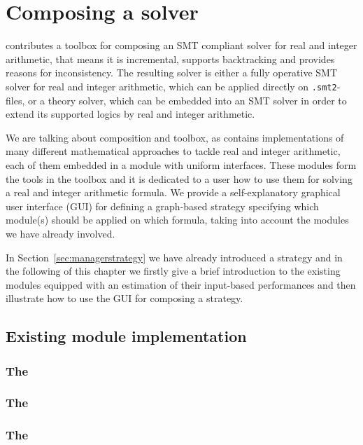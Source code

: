 \chapter{Composing a solver}
\label{chapter:composingats}
\smtrat contributes a toolbox for composing an SMT compliant solver for real and integer arithmetic, that means it 
is incremental, supports backtracking and provides reasons for inconsistency. The resulting
solver is either a fully operative SMT solver for real and integer arithmetic, which can be applied
directly on \texttt{.smt2}-files, or a theory solver, which can be embedded into an SMT 
solver in order to extend its supported logics by real and integer arithmetic.

We are talking about composition and toolbox, as \smtrat contains implementations
of many different mathematical approaches to tackle real and integer arithmetic, each of them
embedded in a module with uniform interfaces. These modules form the tools in the toolbox
and it is dedicated to a user how to use them for solving a real and integer arithmetic formula.
We provide a self-explanatory graphical user interface (GUI) for defining a graph-based 
strategy specifying which module(s) should be applied on which formula, 
taking into account the modules we have already involved.

In Section~\ref{sec:managerstrategy} we have already introduced
a strategy and in the following of this chapter we firstly give a brief introduction 
to the existing modules equipped with an estimation of their input-based performances and then illustrate
how to use the GUI for composing a strategy.

\section{Existing module implementation}
\subsection{The \cnferModuleClass}

\subsection{The \satModuleClass}

\subsection{The \lraModuleClass}

